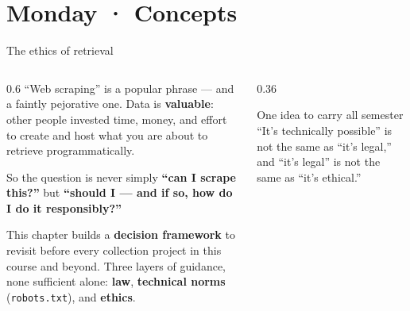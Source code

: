 \documentclass[9pt,aspectratio=169]{beamer}
\begin{document}
\section{Monday · Concepts}

\begin{frame}{The ethics of retrieval}
    \begin{columns}[T]
        \begin{column}{0.6\textwidth}
            ``Web scraping'' is a popular phrase --- and a faintly pejorative one. Data is \textbf{valuable}: other people invested time, money, and effort to create and host what you are about to retrieve programmatically.

            \vspace{0.9em}

            So the question is never simply \textbf{``can I scrape this?''} but \textbf{``should I --- and if so, how do I do it responsibly?''}

            \vspace{0.9em}

            This chapter builds a \textbf{decision framework} to revisit before every collection project in this course and beyond. Three layers of guidance, none sufficient alone: \textbf{law}, \textbf{technical norms} (\texttt{robots.txt}), and \textbf{ethics}.
        \end{column}
        \begin{column}{0.36\textwidth}
            \begin{alertblock}{One idea to carry all semester}
                \footnotesize ``It's technically possible'' is not the same as ``it's legal,'' and ``it's legal'' is not the same as ``it's ethical.''
            \end{alertblock}
        \end{column}
    \end{columns}
\end{frame}
\end{document}
